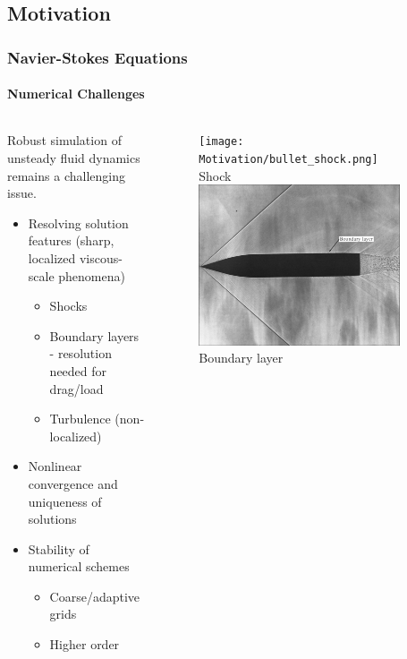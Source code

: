 \documentclass[18pt,xcolor=table]{beamer}
\begin{document}
\subsection{Motivation}
\begin{frame}[t]
\frametitle{Navier-Stokes Equations}
\framesubtitle{Numerical Challenges}
\begin{columns}[c]
\begin{column}{.6\textwidth}
Robust simulation of unsteady fluid dynamics remains a challenging issue.
\vspace{2ex}

\begin{itemize}
\item{} Resolving solution features (sharp, localized viscous-scale phenomena)
\begin{itemize}
\item{} Shocks
\item{} Boundary layers - resolution needed for drag/load
\item{} Turbulence (non-localized)
\end{itemize}
\item{} Nonlinear convergence and uniqueness of solutions
\item{} Stability of numerical schemes
\begin{itemize}
\item{} Coarse/adaptive grids
\item{} Higher order
\end{itemize}
\end{itemize}
\end{column}
\begin{column}{.4\textwidth}
\vspace{-3ex}
\begin{figure}
\centering
\texttt{[image: Motivation/bullet\_shock.png]}\\
Shock\\\vspace{1ex}
\includegraphics[width=0.9\textwidth]{Motivation/boundary_layer.png}\\
Boundary layer
\end{figure}
\end{column}
\end{columns}
\end{frame}  
\end{document}
